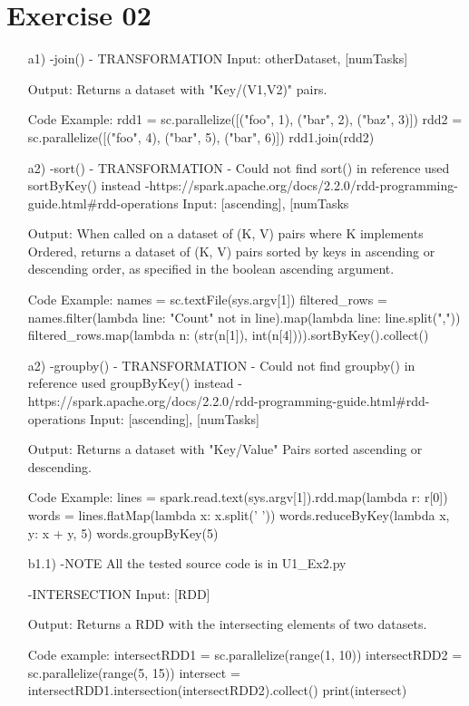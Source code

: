 \documentclass[11pt,a4paper]{scrartcl}
\begin{document}
\section*{Exercise 02}
\begin{itemize}
	\item[a1)]
		-join() - TRANSFORMATION	
		Input:
		otherDataset, [numTasks]
		
		Output:
		Returns a dataset with "Key/(V1,V2)" pairs.
		
		Code Example:
    		rdd1 = sc.parallelize([("foo", 1), ("bar", 2), ("baz", 3)])
    		rdd2 = sc.parallelize([("foo", 4), ("bar", 5), ("bar", 6)])
    		rdd1.join(rdd2)
	\item[a2)]
    		-sort() - TRANSFORMATION - Could not find sort() in reference used sortByKey() instead
    		-https://spark.apache.org/docs/2.2.0/rdd-programming-guide.html#rdd-operations
    		Input:
		[ascending], [numTasks
		
		Output:
		When called on a dataset of (K, V) pairs where K implements Ordered, returns a dataset of (K, V) pairs sorted by keys in ascending or 			descending order, as specified in the boolean ascending argument.
		
		Code Example:
    		names = sc.textFile(sys.argv[1])
    		filtered_rows = names.filter(lambda line: "Count" not in line).map(lambda line: line.split(","))
    		filtered_rows.map(lambda n: (str(n[1]), int(n[4]))).sortByKey().collect()
	\item[a2)]
    		-groupby() - TRANSFORMATION - Could not find groupby() in reference used groupByKey() instead
    		-https://spark.apache.org/docs/2.2.0/rdd-programming-guide.html#rdd-operations
    		Input:
		[ascending], [numTasks]
		
		Output:
		Returns a dataset with "Key/Value" Pairs sorted ascending or descending.
		
		Code Example:
    		lines = spark.read.text(sys.argv[1]).rdd.map(lambda r: r[0])
    		words = lines.flatMap(lambda x: x.split(' '))
    		words.reduceByKey(lambda x, y: x + y, 5)
    		words.groupByKey(5)
    
	\item[b1.1)]
		-NOTE
		All the tested source code is in U1_Ex2.py
	
		-INTERSECTION
		Input:
		[RDD]
		
		Output:
		Returns a RDD with the intersecting elements of two datasets.
		
		Code example:
		intersectRDD1 = sc.parallelize(range(1, 10))
    		intersectRDD2 = sc.parallelize(range(5, 15))
    		intersect = intersectRDD1.intersection(intersectRDD2).collect()
    		print(intersect)
		

\end{itemize}
\end{document}
